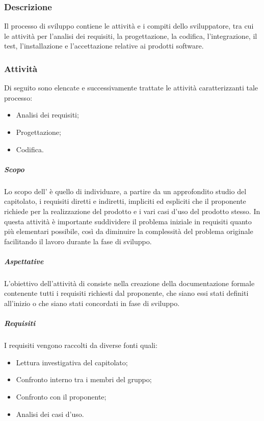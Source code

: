 \subsubsection{Descrizione} \label{subsubsection:Sviluppo_Descrizione}
Il processo di sviluppo contiene le attività e i compiti dello sviluppatore, tra cui le attività per l'analisi dei requisiti, la progettazione,
la codifica, l'integrazione, il test, l'installazione e l'accettazione relative ai prodotti software.

\subsubsection{Attività} \label{subsubsection:Attivita'}
Di seguito sono elencate e successivamente trattate le attività caratterizzanti tale processo:
\begin{itemize}
    \item Analisi dei requisiti;
    \item Progettazione;
    \item Codifica.
\end{itemize}

\paragraph{\docNameAdR} \label{paragraph:Analisi dei requisiti}
\subparagraph{Scopo}
Lo scopo dell'\docNameAdRLow{} è quello di individuare, a partire da un approfondito studio del capitolato, i requisiti diretti e indiretti,
impliciti ed espliciti che il proponente richiede per la realizzazione del prodotto e i vari casi d'uso del prodotto stesso. In questa attività è importante
suddividere il problema iniziale in requisiti quanto più elementari possibile, così da diminuire la complessità del problema originale
facilitando il lavoro durante la fase di sviluppo.

\subparagraph{Aspettative} \label{subparagraph:ADR_Aspettative}
L'obiettivo dell'attività di \docNameAdRLow{} consiste nella creazione della documentazione formale contenente tutti i requisiti
richiesti dal proponente, che siano essi stati definiti all'inizio o che siano stati concordati in fase di sviluppo.

\subparagraph{Requisiti} \label{subparagraph:Requisiti}
I requisiti vengono raccolti da diverse fonti quali:
\begin{itemize}
    \item Lettura investigativa del capitolato;
    \item Confronto interno tra i membri del gruppo;
    \item Confronto con il proponente;
    \item Analisi dei casi d'uso.
\end{itemize}

